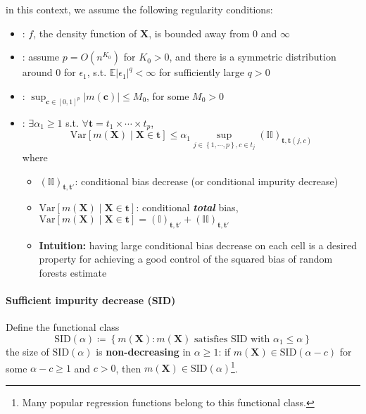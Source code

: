 \documentclass[twoside]{article}
\begin{document}
in this context, we assume the following regularity conditions:
\begin{itemize}
    \item {}: $f$, the density function of $\mathbf{X}$, is bounded away from $0$ and $\infty$
    \item {}: assume $p=O(n^{K_0})$ for $K_0>0$, and there is a symmetric distribution around $0$ for $\epsilon_1$, s.t. $\mathbb{E}\left\vert \epsilon_1 \right\vert^q < \infty$ for sufficiently large $q>0$
    \item {}: $\sup_{\mathbf{c}\in [0,1]^p}\left\vert m(\mathbf{c}) \right\vert \leq M_0$, for some $M_0>0$
    \item {}: $\exists \alpha_1\geq 1$ s.t. $\forall \mathbf{t} = t_1\times \cdots \times t_p$, $$ \mathrm{Var}\left[m(\mathbf{X})\mid \mathbf{X}\in\mathbf{t}\right] \leq \alpha_1 \sup_{j\in \left\{1,\cdots, p \right\}, c\in t_j} \left(\mathbb{II}\right)_{\mathbf{t,t}(j,c)}$$where 
    \begin{itemize}
        \item $\left( \mathbb{II} \right)_{\mathbf{t,t}'}$: conditional bias decrease (or conditional impurity decrease)
        \item $\mathrm{Var}\left[m(\mathbf{X})\mid \mathbf{X}\in\mathbf{t}\right]$: conditional \textbf{\textit{total}} bias, $\mathrm{Var}\left[m(\mathbf{X})\mid \mathbf{X}\in\mathbf{t}\right]= \left( \mathbb{I} \right)_{\mathbf{t,t}'}+\left( \mathbb{II} \right)_{\mathbf{t,t}'}$
        \item \textbf{Intuition:} having large conditional bias decrease on each cell is a desired property for achieving a good control of the squared bias of random forests estimate
    \end{itemize}
\end{itemize}

\paragraph*{Sufficient impurity decrease (SID)}
Define the functional class 
$$
\mathrm{SID}(\alpha) \coloneq \left\{ m(\mathbf{X}): m(\mathbf{X}) \text{ satisfies SID with }\alpha_1 \leq \alpha \right\}
$$
the size of $\mathrm{SID}(\alpha)$ is \textbf{non-decreasing} in $\alpha \geq 1$: if $m(\mathbf{X})\in \mathrm{SID}(\alpha -c)$ for some $\alpha-c\geq 1$ and $c>0$, then $m(\mathbf{X})\in \mathrm{SID}(\alpha)$\footnote{Many popular regression functions belong to this functional class.}.
\end{document}
